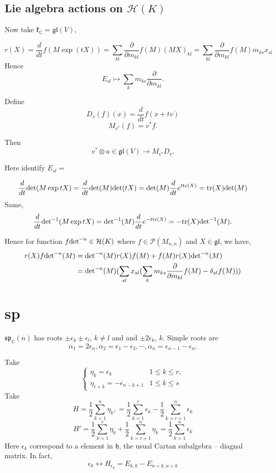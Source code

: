 \documentclass[12pt]{article}
\def\bC{{\mathbb{C}}}
\def\sp{{\mathfrak{sp}}}
\def\det{{\rm det}}
\def\agl{\mathfrak{gl}}
\def\fhh{\mathfrak{h}}
\def\fkk{\mathfrak{k}}
\def\chh{\mathcal{H}}
\def\cpp{\mathcal{P}}
\def\tr{\mathrm{tr}}
\begin{document}
\subsection{Lie algebra actions on $\chh(K)$ }
Now take $\fkk_\bC = \agl(V)$, 

\[
r(X) = \frac{d}{dt} f(M \exp(tX)) 
= \sum_{kl} \frac{\partial}{\partial m_{kl}} f (M) (MX)_{kl}
= \sum_{kl} \frac{\partial}{\partial m_{kl}} f (M) m_{ks} x_{sl}
\]
Hence 
\[
E_{sl} \mapsto \sum_{k} m_{ks} \frac{\partial}{\partial m_{kl}}.
\]

Define 
\[
D_v(f)(x) = \frac{d}{dt}f(x+tv)
\]
\[
M_{v^*}(f) = v^* f.
\]

Then 
\[
v^*\otimes u \in \agl(V) \to  M_{v^*} D_v.
\]

Here identify $E_{sl} = $

\[
\frac{d}{dt} \det(M\exp tX) = \frac{d}{dt}\det(M)\det(tX) 
 = \det(M)  \frac{d}{dt} e^{t\tr(X)} = \tr(X) \det(M) 
\]
Same,
\[
\frac{d}{dt} \det^{-1}(M\exp tX) = \det^{-1}(M) \frac{d}{dt}e^{-t\tr(X)}
=-\tr(X) \det^{-1}(M).
\]

Hence for function $f\det^{-n} \in \chh(K)$ where $f\in \cpp(M_{n,n})$ and
$X \in \agl$, we have, 
\[
\begin{split}
r(X) f\det^{-n}(M) &= \det^{-n}(M) r(X) f(M) + f(M) r(X) \det^{-n}(M)\\
 &= \det^{-n}(M) 
(\sum_{sl} x_{sl} (\sum_{k} m_{ks} \frac{\partial}{\partial m_{kl}} f(M) 
- \delta_{sl}f(M)))
\end{split}
\]
 

\section{sp}

$\sp_\bC(n)$ has roots $\pm \epsilon_k \pm \epsilon_l$, $k\neq l$ and 
and $\pm 2\epsilon_k$, $k$.
Simple roots are 
\[
\alpha_1 = 2\epsilon_n, \alpha_2 = \epsilon_1 -\epsilon_2, \cdots, 
\alpha_n = \epsilon_{n-1}-\epsilon_{n}.
\]

Take 
\[
\begin{cases}
\eta_k = \epsilon_k & 1\leq k \leq r,\\
\eta_{r+k}= -\epsilon_{n-k+1} & 1\leq k \leq s
\end{cases}
\]
Take 
\[
H = \frac{1}{2} \sum_{k=1}^n \eta_k, = \frac{1}{2} \sum_{k=1}^r \epsilon_k 
- \frac{1}{2} \sum_{k=r+1}^n \epsilon_k
\]
\[
H' = \frac{1}{2} \sum_{k=1}^r \eta_k + \frac{1}{2} \sum_{k=r+1}^n \eta_k
= \frac{1}{2} \sum_{k=1}^n \epsilon_k
\]
Here
$\epsilon_k$ correspond to a element in $\fhh$, the usual Cartan subalgebra
-- diagnal matrix.
In fact, 
\[
\epsilon_k \leftrightarrow H_{\epsilon_k}= E_{k,k}-E_{n+k,n+k}
\] 
\end{document}
